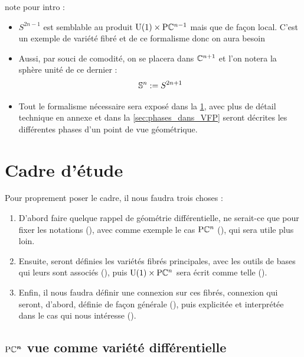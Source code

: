 
note pour intro :

\begin{itemize}
	
	\item $S^{2n-1}$ est semblable au produit $\text{\normalfont U}(1)\times \text{\normalfont P}\mathbb{C}^{n-1}$ mais que de façon local. C'est un exemple de variété fibré et de ce formalisme donc on aura besoin
	
	\item Aussi, par souci de comodité, on se placera dans $\mathbb{C}^{n+1}$ et l'on notera la sphère unité de ce dernier :
	\[\mathbb{ S}^{n} := S^{2n+1}\]
	
	\item Tout le formalisme nécessaire sera exposé dans la \cref{sec:cadre_geodiff}, avec plus de détail technique en annexe et dans la \cref{sec:phases_dans_VFP} seront décrites les différentes phases d'un point de vue géométrique.
	
\end{itemize}



\section{Cadre d'étude}\label{sec:cadre_geodiff}

Pour proprement poser le cadre, il nous faudra trois choses :
\begin{enumerate}
	
	\item D'abord faire quelque rappel de géométrie différentielle, ne serait-ce que pour fixer les notations (), avec comme exemple le cas $\text{\normalfont P}\mathbb{C}^{n}$ (), qui sera utile plus loin. 
	
	\item Ensuite, seront définies les variétés fibrés principales, avec les outils de bases qui leurs sont associés (), puis $\text{\normalfont U}(1)\times \text{\normalfont P}\mathbb{C}^{n}$ sera écrit comme telle ().
	
	\item Enfin, il nous faudra définir une connexion sur ces fibrés, connexion qui seront, d'abord, définie de façon générale (), puis explicitée et interprétée dans le cas qui nous intéresse ().
	
\end{enumerate}

\subsection{$\boldsymbol{\text{\normalfont P}\mathbb{C}^{n}}$ vue comme variété différentielle} \label{subsec:construc_PC^n}


